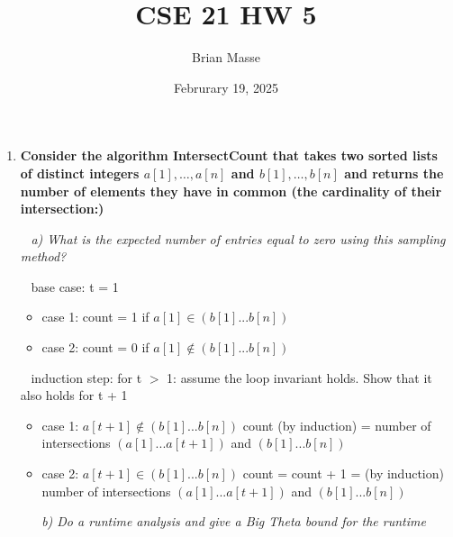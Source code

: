 \documentclass[12pt, letterpaper]{article}
\title{CSE 21 HW 5}
\author{Brian Masse}
\date{Februrary 19, 2025}
\begin{document}
\maketitle
\newpage

\begin{enumerate}

    \item
    \bf{Consider the algorithm IntersectCount that takes two sorted lists of distinct
    integers $a[1],\dots,a[n]$ and $b[1],\dots,b[n]$ and returns the number of
    elements they have in common (the cardinality of their intersection:)}

    \-\ \newline
    \it{ a) What is the expected number of entries equal to zero using this sampling method? }

    \-\ \newline
    base case: t = 1

    \begin{itemize}
        \item case 1: count = 1 if \(a[1] \in ( b[1]...b[n] ) \)

        \item case 2: count = 0 if \(a[1] \notin ( b[1]...b[n] ) \)
        
    \end{itemize} 

    \-\ \newline
    induction step: for t \( > \) 1: \textnormal{assume the loop invariant holds. Show that it also holds for t + 1 }

    \begin{itemize}
        \item case 1: \( a[t + 1] \notin (b[1]...b[n])\) 
        \newline \textnormal{ count (by induction) = number of intersections \((a[1]...a[t + 1])\) and \((b[1]...b[n]) \) }

        \item case 2:  \( a[t + 1] \in (b[1]...b[n])\)
        \newline \textnormal{ count = count + 1 = (by induction) number of intersections \((a[1]...a[t + 1])\) and \((b[1]...b[n]) \) }
        
    \end{itemize} 


    \-\ \newline
    \-\ \newline
    \it{ b) Do a runtime analysis and give a Big Theta bound for the runtime }


\end{enumerate}
\end{document}
